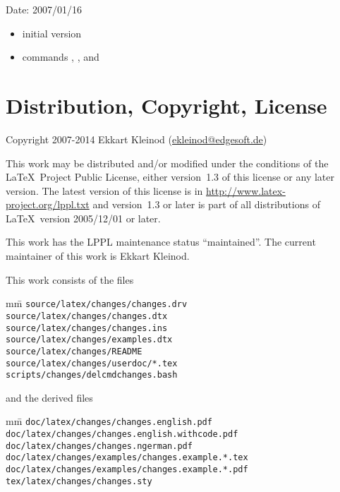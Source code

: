 
Date: 2007/01/16
\begin{itemize}
	\item initial version
	\item commands , , and 
\end{itemize}


\section{Distribution, Copyright, License}

Copyright 2007-2014 Ekkart Kleinod (\href{mailto:ekleinod@edgesoft.de}{ekleinod@edgesoft.de})

This work may be distributed and/or modified under the conditions of the \LaTeX\ Project Public License, either version~1.3 of this license or any later version.
The latest version of this license is in \url{http://www.latex-project.org/lppl.txt} and version~1.3 or later is part of all distributions of \LaTeX\ version 2005/12/01 or later.

This work has the LPPL maintenance status ``maintained''.
The current maintainer of this work is Ekkart Kleinod.

This work consists of the files

\begin{tabbing}
	mm\=\kill
	\>\texttt{source/latex/changes/changes.drv}\\
	\>\texttt{source/latex/changes/changes.dtx}\\
	\>\texttt{source/latex/changes/changes.ins}\\
	\>\texttt{source/latex/changes/examples.dtx}\\
	\>\texttt{source/latex/changes/README}\\
	\>\texttt{source/latex/changes/userdoc/*.tex}\\

	\>\texttt{scripts/changes/delcmdchanges.bash}
\end{tabbing}


and the derived files

\begin{tabbing}
	mm\=\kill
	\>\texttt{doc/latex/changes/changes.english.pdf}\\
	\>\texttt{doc/latex/changes/changes.english.withcode.pdf}\\
	\>\texttt{doc/latex/changes/changes.ngerman.pdf}\\

	\>\texttt{doc/latex/changes/examples/changes.example.*.tex}\\
	\>\texttt{doc/latex/changes/examples/changes.example.*.pdf}\\

	\>\texttt{tex/latex/changes/changes.sty}
\end{tabbing}



